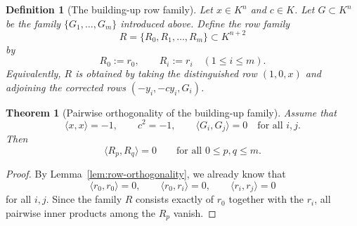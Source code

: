 \documentclass[12pt]{article}
\newtheorem{defn}{Definition}[section]
\newtheorem{theorem}{Theorem}[section]
\begin{document}
\begin{defn}[The building-up row family]
\label{def:buildRows-family}
Let $x\in K^n$ and $c\in K$. Let $G\subset K^n$ be the family $\{G_1,\dots,G_m\}$ introduced above. Define the row family
\[
R=\{R_0,R_1,\dots,R_m\}\subset K^{n+2}
\]
by
\[
R_0:=r_0,
\qquad
R_i:=r_i \quad (1\le i\le m).
\]
Equivalently, $R$ is obtained by taking the distinguished row $(1,0,x)$ and adjoining the corrected rows $(-y_i,-c y_i,G_i)$.
\end{defn}

\begin{theorem}[Pairwise orthogonality of the building-up family]
\label{thm:buildrows-orth}
Assume that
\[
\langle x,x\rangle=-1,
\qquad
c^2=-1,
\qquad
\langle G_i,G_j\rangle=0 \quad \text{for all } i,j.
\]
Then
\[
\langle R_p,R_q\rangle = 0
\qquad
\text{for all } 0\le p,q\le m.
\]
\end{theorem}

\begin{proof}
By Lemma~\ref{lem:row-orthogonality}, we already know that
\[
\langle r_0,r_0\rangle=0,\qquad
\langle r_0,r_i\rangle=0,\qquad
\langle r_i,r_j\rangle=0
\]
for all $i,j$. Since the family $R$ consists exactly of $r_0$ together with the $r_i$, all pairwise inner products among the $R_p$ vanish.
\end{proof}
\end{document}
